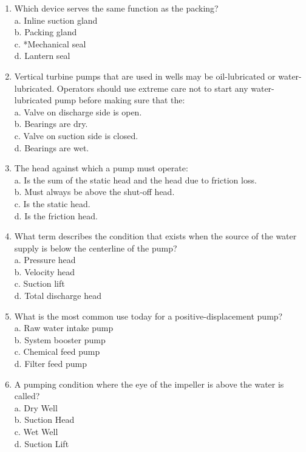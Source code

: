 \begin{enumerate}[1.]
  \item Which device serves the same function as the packing?\\
a. Inline suction gland\\
b. Packing gland\\
c. *Mechanical seal\\
d. Lantern seal


\item Vertical turbine pumps that are used in wells may be oil-lubricated or water-lubricated. Operators should use extreme care not to start any water-lubricated pump before making sure that the:\\
a.	Valve on discharge side is open.\\
b. Bearings are dry.\\
c.	Valve on suction side is closed.\\
d.	Bearings are wet.

\item The head against which a pump must operate:\\
a.	Is the sum of the static head and the head due to friction loss.\\
b.	Must always be above the  shut-off  head.\\
c.	Is the static head.\\
d.	Is the friction head.

\item What term describes the condition that exists when the source of the water supply is below the  centerline of the  pump?\\
a.	Pressure  head\\
b.	Velocity head\\
c.	Suction lift\\
d.	Total discharge head

\item What is the most common use today for a positive-displacement pump?\\
a.	Raw water intake pump\\
b.	System booster pump\\
c.	Chemical feed pump\\
d.	Filter feed pump

\item A pumping condition where the eye of the impeller is above the water is called?\\
a.	Dry Well\\
b.	Suction Head\\
c.	Wet Well\\
d.	Suction Lift


\end{enumerate}
